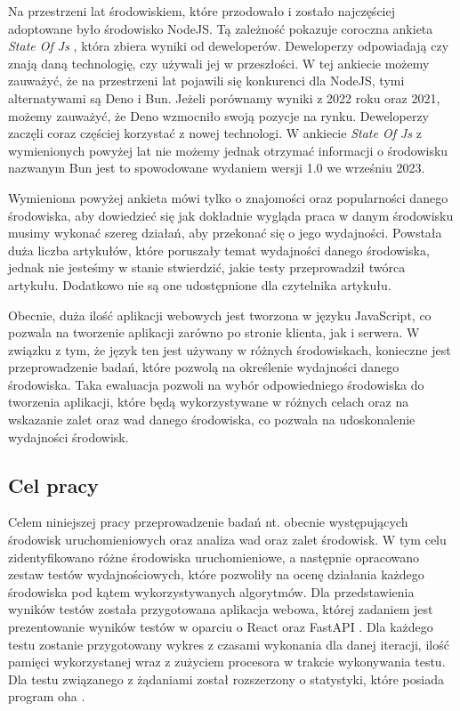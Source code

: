 Na przestrzeni lat środowiskiem, które przodowało i zostało najczęściej adoptowane było środowisko NodeJS. Tą zależność pokazuje coroczna ankieta \textit{State Of Js} \cite{State_of_js:2021} \cite{State_of_js:2022}, która zbiera wyniki od deweloperów. Deweloperzy odpowiadają czy znają daną technologię, czy używali jej w przeszłości. W tej ankiecie możemy zauważyć, że na przestrzeni lat pojawili się konkurenci dla NodeJS, tymi alternatywami są Deno i Bun. Jeżeli porównamy wyniki z 2022 roku oraz 2021, możemy zauważyć, że Deno wzmocniło swoją pozycje na rynku. Deweloperzy zaczęli coraz częściej korzystać z nowej technologi. W ankiecie \textit{State Of Js} z wymienionych powyżej lat nie możemy jednak otrzymać informacji o środowisku nazwanym Bun jest to spowodowane wydaniem wersji 1.0 we wrześniu 2023.

Wymieniona powyżej ankieta mówi tylko o znajomości oraz popularności danego środowiska, aby dowiedzieć się jak dokładnie wygląda praca w danym środowisku musimy wykonać szereg działań, aby przekonać się o jego wydajności. Powstała duża liczba artykułów, które poruszały temat wydajności danego środowiska, jednak nie jesteśmy w stanie stwierdzić, jakie testy przeprowadził twórca artykułu. Dodatkowo nie są one udostępnione dla czytelnika artykułu.

Obecnie, duża ilość aplikacji webowych jest tworzona w języku JavaScript, co pozwala na tworzenie aplikacji zarówno po stronie klienta, jak i serwera. W związku z tym, że język ten jest używany w różnych środowiskach, konieczne jest przeprowadzenie badań, które pozwolą na określenie wydajności danego środowiska. Taka ewaluacja pozwoli na wybór odpowiedniego środowiska do tworzenia aplikacji, które będą wykorzystywane w różnych celach oraz na wskazanie zalet oraz wad danego środowiska, co pozwala na udoskonalenie wydajności środowisk.  

\subsection*{Cel pracy}
Celem niniejszej pracy przeprowadzenie badań nt. obecnie występujących środowisk uruchomieniowych oraz analiza wad oraz zalet środowisk. W tym celu zidentyfikowano różne środowiska uruchomieniowe, a następnie opracowano zestaw testów wydajnościowych, które pozwoliły na ocenę działania każdego środowiska pod kątem wykorzystywanych algorytmów. Dla przedstawienia wyników testów  została przygotowana aplikacja webowa, której zadaniem jest prezentowanie wyników testów w oparciu o React \cite{React} oraz FastAPI \cite{FastAPI}. Dla każdego testu zostanie przygotowany wykres z czasami wykonania dla danej iteracji, ilość pamięci wykorzystanej wraz z zużyciem procesora w trakcie wykonywania testu. Dla testu związanego z żądaniami  został rozszerzony o statystyki, które posiada program oha \cite{oha}.


